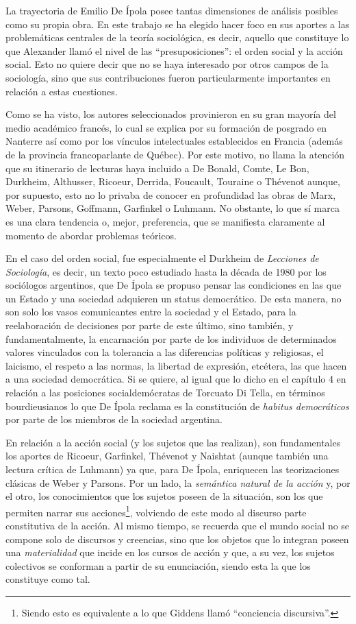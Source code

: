 La trayectoria de Emilio De Ípola posee tantas dimensiones de análisis posibles como su propia obra. En este trabajo se ha elegido hacer foco en sus aportes a las problemáticas centrales de la teoría sociológica, es decir, aquello que constituye lo que Alexander llamó el nivel de las ``presuposiciones'': el orden social y la acción social. Esto no quiere decir que no se haya interesado por otros campos de la sociología, sino que sus contribuciones fueron particularmente importantes en relación a estas cuestiones.

Como se ha visto, los autores seleccionados provinieron en su gran mayoría del medio académico francés, lo cual se explica por su formación de posgrado en Nanterre así como por los vínculos intelectuales establecidos en Francia (además de la provincia francoparlante de Québec). Por este motivo, no llama la atención que su itinerario de lecturas haya incluido a De Bonald, Comte, Le Bon, Durkheim, Althusser, Ricoeur, Derrida, Foucault, Touraine o Thévenot aunque, por supuesto, esto no lo privaba de conocer en profundidad las obras de Marx, Weber, Parsons, Goffmann, Garfinkel o Luhmann. No obstante, lo que sí marca es una clara tendencia o, mejor, preferencia, que se manifiesta claramente al momento de abordar problemas teóricos.

En el caso del orden social, fue especialmente el Durkheim de \emph{Lecciones de Sociología}, es decir, un texto poco estudiado hasta la década de 1980 por los sociólogos argentinos, que De Ípola se propuso pensar las condiciones en las que un Estado y una sociedad adquieren un status democrático. De esta manera, no son solo los vasos comunicantes entre la sociedad y el Estado, para la reelaboración de decisiones por parte de este último, sino también, y fundamentalmente, la encarnación por parte de los individuos de determinados valores vinculados con la tolerancia a las diferencias políticas y religiosas, el laicismo, el respeto a las normas, la libertad de expresión, etcétera, las que hacen a una sociedad democrática. Si se quiere, al igual que lo dicho en el capítulo 4 en relación a las posiciones socialdemócratas de Torcuato Di Tella, en términos bourdieusianos lo que De Ípola reclama es la constitución de \emph{habitus democráticos} por parte de los miembros de la sociedad argentina.

En relación a la acción social (y los sujetos que las realizan), son fundamentales los aportes de Ricoeur, Garfinkel, Thévenot y Naishtat (aunque también una lectura crítica de Luhmann) ya que, para De Ípola, enriquecen las teorizaciones clásicas de Weber y Parsons. Por un lado, la \emph{semántica natural de la acción} y, por el otro, los conocimientos que los sujetos poseen de la situación, son los que permiten narrar sus acciones\footnote{Siendo esto es equivalente a lo que Giddens llamó ``conciencia discursiva''.}, volviendo de este modo al discurso parte constitutiva de la acción. Al mismo tiempo, se recuerda que el mundo social no se compone solo de discursos y creencias, sino que los objetos que lo integran poseen una \emph{materialidad} que incide en los cursos de acción y que, a su vez, los sujetos colectivos se conforman a partir de su enunciación, siendo esta la que los constituye como tal.

